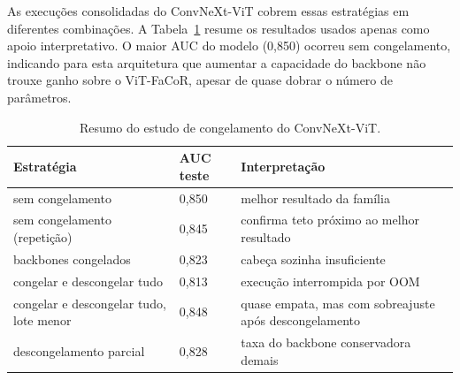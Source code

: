 As execuções consolidadas do ConvNeXt-ViT cobrem essas estratégias em diferentes combinações. A Tabela~\ref{tab:convnext_vit_freeze_appendix} resume os resultados usados apenas como apoio interpretativo. O maior AUC do modelo (0,850) ocorreu sem congelamento, indicando para esta arquitetura que aumentar a capacidade do backbone não trouxe ganho sobre o ViT-FaCoR, apesar de quase dobrar o número de parâmetros.

\begin{table}[h]
\centering
\small
\caption{Resumo do estudo de congelamento do ConvNeXt-ViT.}
\label{tab:convnext_vit_freeze_appendix}
\begin{tabular}{lll}
\hline
\textbf{Estratégia} & \textbf{AUC teste} & \textbf{Interpretação} \\
\hline
sem congelamento & 0{,}850 & melhor resultado da família \\
sem congelamento (repetição) & 0{,}845 & confirma teto próximo ao melhor resultado \\
backbones congelados & 0{,}823 & cabeça sozinha insuficiente \\
congelar e descongelar tudo & 0{,}813 & execução interrompida por OOM \\
congelar e descongelar tudo, lote menor & 0{,}848 & quase empata, mas com sobreajuste após descongelamento \\
descongelamento parcial & 0{,}828 & taxa do backbone conservadora demais \\
\hline
\end{tabular}
\end{table}
